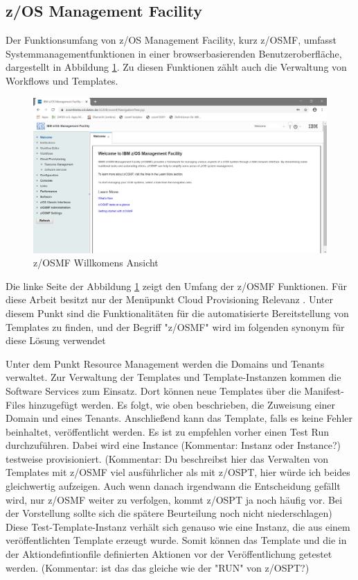 \subsection{z/OS Management Facility}\label{sssec:zosmf}
Der Funktionsumfang von z/OS Management Facility, kurz z/OSMF, umfasst Systemmanagementfunktionen
in einer browserbasierenden Benutzeroberfläche, dargestellt in Abbildung \ref{fig:zosmf_welcome}.
Zu diesen Funktionen zählt auch die Verwaltung von Workflows und Templates.

\begin{figure}[h]
\centering
\includegraphics[width=\textwidth]{figures/zosmf.png}
\caption{z/OSMF Willkomens Ansicht}
\label{fig:zosmf_welcome}
\end{figure}

Die linke Seite der Abbildung \ref{fig:zosmf_welcome} zeigt den Umfang der z/OSMF  Funktionen.
Für diese Arbeit besitzt nur der Menüpunkt \glqq Cloud Provisioning\grqq{} Relevanz .
Unter diesem Punkt sind die Funktionalitäten für die automatisierte Bereitstellung von Templates zu finden, und der Begriff "z/OSMF" wird im folgenden synonym für diese Lösung verwendet
\cite{Rotthove.2018}

Unter dem Punkt \glqq Resource Management\grqq{} werden die \glqq Domains\grqq{} und \glqq Tenants\grqq{} verwaltet.
Zur Verwaltung der Templates und Template-Instanzen kommen die \glqq Software Services\grqq{} zum Einsatz.
Dort können neue Templates über die Manifest-Files hinzugefügt werden.
Es folgt, wie oben beschrieben, die Zuweisung einer \glqq Domain\grqq{} und eines \glqq Tenants\grqq{}.
Anschließend kann das Template, falls es keine Fehler beinhaltet, veröffentlicht werden.
Es ist zu empfehlen vorher einen \glqq Test Run\grqq{} durchzuführen.
Dabei wird eine Instance (Kommentar: Instanz oder Instance?) testweise provisioniert.
(Kommentar: Du beschreibst hier das Verwalten von Templates mit z/OSMF viel ausführlicher als mit z/OSPT, hier würde ich beides gleichwertig aufzeigen. Auch wenn danach irgendwann die Entscheidung gefällt wird, nur z/OSMF weiter zu verfolgen, kommt z/OSPT ja noch häufig vor. Bei der Vorstellung sollte sich die spätere Beurteilung noch nicht niederschlagen)
Diese Test-Template-Instanz verhält sich genauso wie eine Instanz, die aus einem veröffentlichten Template erzeugt wurde. 
Somit können  das Template und die in der Aktiondefintionfile definierten Aktionen vor der Veröffentlichung getestet werden.
(Kommentar: ist das das gleiche wie der "RUN" von z/OSPT?)
\cite{Rotthove.2018}
